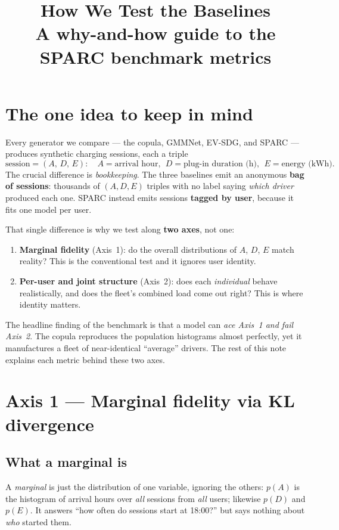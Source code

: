 \documentclass[11pt]{article}
\title{\vspace{-1.2cm}\textbf{How We Test the Baselines}\\[2pt]
\large A why-and-how guide to the SPARC benchmark metrics}
\author{}
\date{}
\begin{document}
\maketitle
\vspace{-1.4cm}

\section{The one idea to keep in mind}
Every generator we compare --- the copula, GMMNet, EV-SDG, and SPARC --- produces synthetic charging sessions, each a triple
\[
\text{session} = (A,\,D,\,E): \quad A=\text{arrival hour},\ \ D=\text{plug-in duration (h)},\ \ E=\text{energy (kWh)} .
\]
The crucial difference is \emph{bookkeeping}. The three baselines emit an anonymous \textbf{bag of sessions}: thousands of $(A,D,E)$ triples with no label saying \emph{which driver} produced each one. SPARC instead emits sessions \textbf{tagged by user}, because it fits one model per user.

That single difference is why we test along \textbf{two axes}, not one:

\begin{enumerate}[leftmargin=1.4em,itemsep=2pt]
\item \textbf{Marginal fidelity} (Axis~1): do the overall distributions of $A$, $D$, $E$ match reality? This is the conventional test and it ignores user identity.
\item \textbf{Per-user and joint structure} (Axis~2): does each \emph{individual} behave realistically, and does the fleet's combined load come out right? This is where identity matters.
\end{enumerate}

The headline finding of the benchmark is that a model can \emph{ace Axis~1 and fail Axis~2}. The copula reproduces the population histograms almost perfectly, yet it manufactures a fleet of near-identical ``average'' drivers. The rest of this note explains each metric behind these two axes.

\section{Axis 1 --- Marginal fidelity via KL divergence}

\subsection{What a marginal is}
A \emph{marginal} is just the distribution of one variable, ignoring the others: $p(A)$ is the histogram of arrival hours over \emph{all} sessions from \emph{all} users; likewise $p(D)$ and $p(E)$. It answers ``how often do sessions start at 18:00?'' but says nothing about \emph{who} started them.
\end{document}
